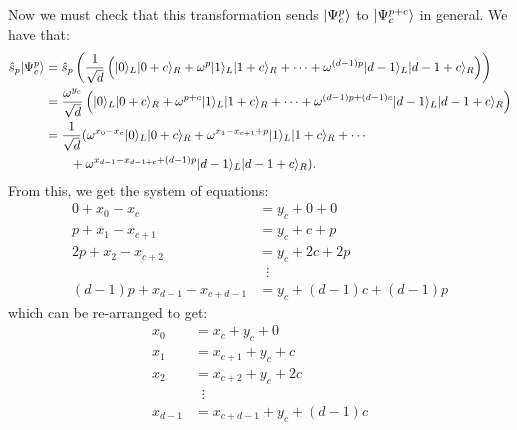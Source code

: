 \begin{enumerate}
Now we must check that this transformation sends $| \Psi_c^p \rangle$ to $| \Psi_c^{p+c} \rangle$ in general. We have that:
\begin{equation}
  \begin{split}
          \hat{s}_p | \Psi_c^p \rangle &= \hat{s}_p  \left( \frac{1}{\sqrt{d}}\left(| 0 \rangle_L| 0+c \rangle_R + \omega^{p} | 1 \rangle_L| 1+c \rangle_R + \cdots + \omega^{(d-1)p} | d-1 \rangle_L| d-1 + c \rangle_R\right) \right) \\
                             &= \frac{\omega^{y_c}}{\sqrt{d}}\left(| 0 \rangle_L| 0+c \rangle_R + \omega^{p+c} | 1 \rangle_L| 1+c \rangle_R + \cdots + \omega^{(d-1)p + (d-1)c} | d-1 \rangle_L| d-1 + c \rangle_R\right) \\
                             &= \frac{1}{\sqrt{d}} (\omega^{x_0 - x_c}| 0 \rangle_L| 0+c \rangle_R + \omega^{x_1 - x_{c+1} + p} | 1 \rangle_L| 1+c \rangle_R + \cdots \\ & \qquad + \omega^{x_{d-1} - x_{d-1+c} + (d-1)p} | d-1 \rangle_L| d-1 + c \rangle_R).
  \end{split}
\end{equation}
From this, we get the system of equations:
\begin{equation}
  \begin{split}
      0  + x_0 - x_c &= y_c + 0 + 0  \\
  p + x_1 - x_{c+1} &= y_c + c + p \\
  2 p + x_2 - x_{c+2} &= y_c + 2c + 2p \\
  & \; \; \vdots \\
  (d-1) p + x_{d-1} - x_{c+d-1} &= y_c + (d-1)c + (d-1)p
  \end{split}
\end{equation}
which can be re-arranged to get:
\begin{equation} \label{sys2}
\begin{split}
  x_0 &= x_c + y_c + 0 \\
  x_1  &= x_{c+1} +  y_c + c  \\
  x_2 &= x_{c+2} + y_c + 2c  \\
  & \; \; \vdots \\
  x_{d-1}  &= x_{c+d-1} + y_c + (d-1)c
\end{split}
\end{equation}


\end{enumerate}
